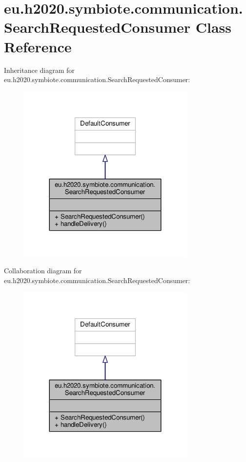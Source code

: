 \hypertarget{classeu_1_1h2020_1_1symbiote_1_1communication_1_1SearchRequestedConsumer}{}\section{eu.\+h2020.\+symbiote.\+communication.\+Search\+Requested\+Consumer Class Reference}
\label{classeu_1_1h2020_1_1symbiote_1_1communication_1_1SearchRequestedConsumer}


Inheritance diagram for eu.\+h2020.\+symbiote.\+communication.\+Search\+Requested\+Consumer\+:
\nopagebreak
\begin{figure}[H]
\begin{center}
\leavevmode
\includegraphics[width=251pt]{classeu_1_1h2020_1_1symbiote_1_1communication_1_1SearchRequestedConsumer__inherit__graph}
\end{center}
\end{figure}


Collaboration diagram for eu.\+h2020.\+symbiote.\+communication.\+Search\+Requested\+Consumer\+:
\nopagebreak
\begin{figure}[H]
\begin{center}
\leavevmode
\includegraphics[width=251pt]{classeu_1_1h2020_1_1symbiote_1_1communication_1_1SearchRequestedConsumer__coll__graph}
\end{center}
\end{figure}
